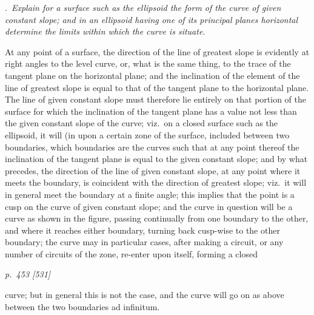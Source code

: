 \documentclass[11pt,a4paper]{article}
\theoremstyle{plain}
\theoremstyle{definition}
\begin{document}
\medskip
{}.\ \textit{Explain for a surface such as the ellipsoid the form of the curve of given
constant slope; and in an ellipsoid having one of its principal planes horizontal determine
the limits within which the curve is situate.}

\medskip
At any point of a surface, the direction of the line of greatest slope is evidently
at right angles to the level curve, or, what is the same thing, to the trace of the
tangent plane on the horizontal plane; and the inclination of the element of the line
of greatest slope is equal to that of the tangent plane to the horizontal plane. The
line of given constant slope must therefore lie entirely on that portion of the surface
for which the inclination of the tangent plane has a value not less than the given
constant slope of the curve; viz.\ on a closed surface such as the ellipsoid, it will (in
upon a certain zone of the surface, included between two boundaries, which boundaries
are the curves such that at any point thereof the inclination of the tangent plane is
equal to the given constant slope; and by what precedes, the direction of the line of
given constant slope, at any point where it meets the boundary, is coincident with
the direction of greatest slope; viz.\ it will in general meet the boundary at a finite
angle; this implies that the point is a cusp on the curve of given constant slope;
and the curve in question will be a curve as shown in the figure, passing continually
from one boundary to the other, and where it reaches either boundary, turning back
cusp-wise to the other boundary; the curve may in particular cases, after making a
circuit, or any number of circuits of the zone, re-enter upon itself, forming a closed

\clearpage

\bigskip
\textit{p.~453 [531]}
\smallskip

\noindent
curve; but in general this is not the case, and the curve will go on as above between
the two boundaries ad infinitum.

\begin{center}
\end{center}
\end{document}
